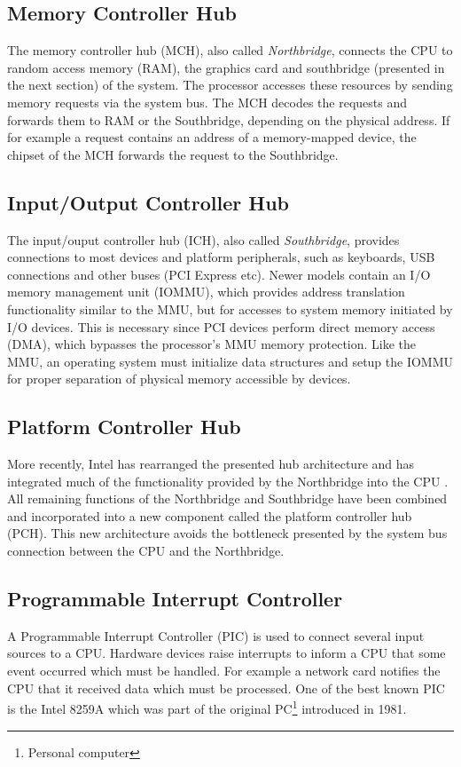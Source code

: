 \subsection{Memory Controller Hub}
The memory controller hub (MCH), also called
\emph{Northbridge}, connects the CPU to random access memory
(RAM), the graphics card and southbridge (presented in the next section) of the
system. The processor accesses these resources by sending memory requests via
the system bus. The MCH decodes the requests and forwards them to RAM or the
Southbridge, depending on the physical address. If for example a request
contains an address of a memory-mapped device, the chipset of the MCH forwards
the request to the Southbridge.

\subsection{Input/Output Controller Hub}\label{subsec:ich}
The input/ouput controller hub (ICH), also called
\emph{Southbridge}, provides connections to most devices and
platform peripherals, such as keyboards, USB connections and other buses (PCI
Express etc). Newer models contain an I/O memory management unit
(IOMMU), which provides address translation functionality similar
to the MMU, but for accesses to system memory initiated by I/O devices.  This is
necessary since PCI devices perform direct memory access (DMA), which
bypasses the processor's MMU memory protection.  Like the MMU, an operating
system must initialize data structures and setup the IOMMU for proper separation
of physical memory accessible by devices.

\subsection{Platform Controller Hub}
More recently, Intel has rearranged the presented hub architecture and has
integrated much of the functionality provided by the Northbridge into the CPU
\cite{IntelQPI}. All remaining functions of the Northbridge and Southbridge have
been combined and incorporated into a new component called the platform
controller hub (PCH). This new architecture avoids the bottleneck
presented by the system bus connection between the CPU and the Northbridge.

\subsection{Programmable Interrupt Controller}\label{subsec:apic}
A Programmable Interrupt Controller (PIC) is used to connect several
input sources to a CPU. Hardware devices raise interrupts to inform a CPU that
some event occurred which must be handled. For example a network card notifies
the CPU that it received data which must be processed. One of the best known PIC
is the Intel 8259A which was part of the original PC\footnote{Personal
computer} introduced in 1981.

